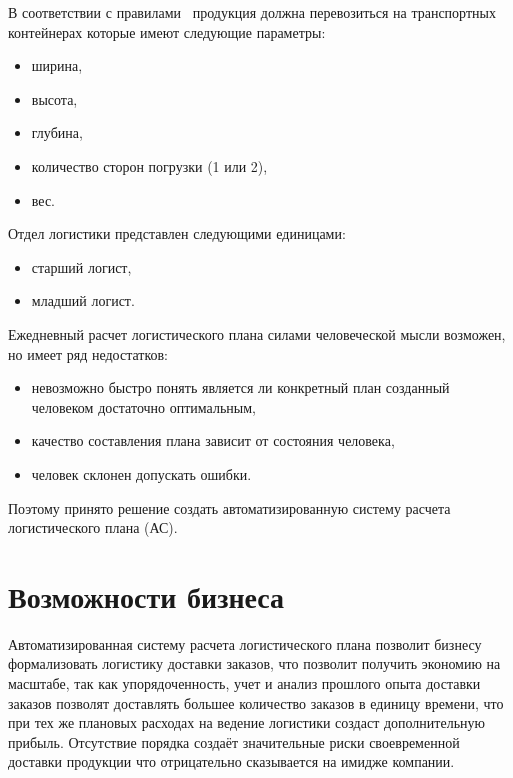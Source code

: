 В соответствии с правилами~\cite{dr} продукция должна перевозиться на транспортных контейнерах которые имеют следующие параметры:
\begin{itemize}
    \item ширина,
    \item высота,
    \item глубина,
    \item количество сторон погрузки (1 или 2),
    \item вес.
\end{itemize}

Отдел логистики представлен следующими единицами:
\begin{itemize}
    \item старший логист,
    \item младший логист.
\end{itemize}

Ежедневный расчет логистического плана силами человеческой мысли возможен, но имеет ряд недостатков:
\begin{itemize}
    \item невозможно быстро понять является ли конкретный план созданный человеком достаточно оптимальным,
    \item качество составления плана зависит от состояния человека,
    \item человек склонен допускать ошибки.
\end{itemize}

Поэтому принято решение создать автоматизированную систему расчета логистического плана (АС).


\section{Возможности бизнеса}
\label{sec:possibilities}

Автоматизированная систему расчета логистического плана позволит бизнесу формализовать логистику доставки заказов,
что позволит получить экономию на масштабе, так как упорядоченность, учет и анализ прошлого опыта доставки заказов позволят
доставлять большее количество заказов в единицу времени, что при тех же плановых расходах на ведение логистики создаст дополнительную прибыль.
Отсутствие порядка создаёт значительные риски своевременной доставки продукции что отрицательно сказывается на имидже компании.

